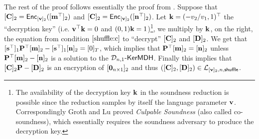 The rest of the proof follows essentially the proof from \cite{AC:GroLu07}. Suppose that $[\mathbf{{C}}]_2=\mathsf{Enc}_{[\mathbf{v}]_2}([\mathbf{{m}}^\top]_2)$ and $[\mathbf{{C}}]_2=\mathsf{Enc}_{[\mathbf{v}]_2}([\mathbf{{n}}^\top]_2)$. Let $\mathbf{k}=(-v_2/v_1,1)^\top$ the ``decryption key'' (i.e. $\mathbf{v}^\top\mathbf{k}=0$ and $(0,1)\mathbf{k}=1$)\footnote{The availability of the decryption key $\mathbf{k}$ in the soundness reduction is possible since the reduction samples by itself the language parameter $\mathbf{v}$. Correspondingly Groth and Lu \cite{AC:GroLu07} proved \emph{Culpable Soundness} (also called co-soundness), which essentially requires the soundness adversary to produce the decryption key.}, we multiply by $\mathbf{{k}}$, on the right, the equation from condition $\ref{shuffle:c}$ to ``decrypt'' $[\mathbf{{C}}]_2$ and $[\mathbf{{D}}]_2$. We get that
$[\mathbf{s}^\top]_1\mathbf{{P}}^\top[\mathbf{{m}}]_2-[\mathbf{s}^\top]_1[\mathbf{{n}}]_2=[0]_T$, which implies that $\mathbf{{P}}^\top[\mathbf{{m}}]_2=[\mathbf{{n}}]_2$ unless $\mathbf{{P}}^\top[\mathbf{{m}}]_2-[\mathbf{{n}}]_2$ is a solution to the $\mathcal{D}_{n,1}\mbox{-}\mathsf{KerMDH}$. Finally this implies that $[\mathbf{{C}}]_2\mathbf{{P}}-[\mathbf{{D}}]_2$ is an encryption of $[\mathbf{{0}}_{n\times 1}]_2$ and thus $([\mathbf{{C}}]_2,[\mathbf{{D}}]_2)\in\mathcal{L}_{[\mathbf{v}]_2,n,\mathsf{shuffle}}$. 



